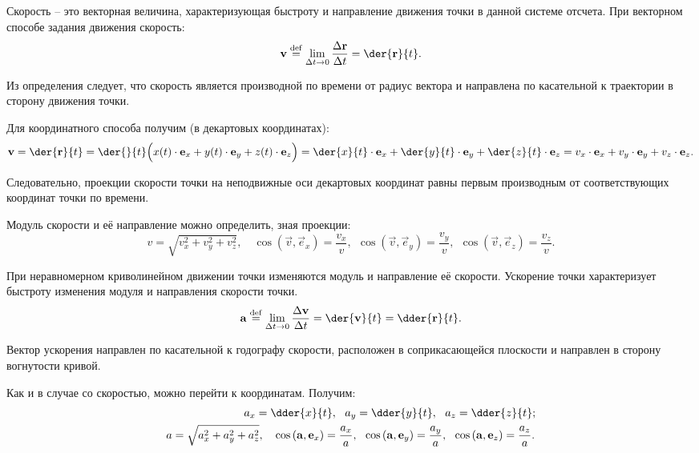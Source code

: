 
Скорость -- это векторная величина, характеризующая быстроту и направление
движения точки в данной системе отсчета. При векторном способе задания движения
скорость:
\[
    \vec{v} \defeq \lim_{\D t \to 0} \Der{\vec{r}}{t} = \der{\vec{r}}{t}.
\]

Из определения следует, что скорость является производной по времени от радиус
вектора и направлена по касательной к траектории в сторону движения точки.

Для координатного способа получим (в декартовых координатах):
\[
    \vec{v} = \der{\vec{r}}{t} = \der{}{t}\Big(x(t)\cdot\vec{e}_x +
    y(t)\cdot\vec{e}_y + z(t)\cdot\vec{e}_z\Big) = \der{x}{t}\cdot\vec{e}_x +
    \der{y}{t}\cdot\vec{e}_y + \der{z}{t}\cdot\vec{e}_z = v_x\cdot\vec{e}_x +
    v_y\cdot\vec{e}_y + v_z\cdot\vec{e}_z.
\]

Следовательно, проекции скорости точки на неподвижные оси декартовых координат
равны первым производным от соответствующих координат точки по времени.

Модуль скорости и её направление можно определить, зная проекции:
\[
    v = \sqrt{v_x^2 + v_y^2 + v_z^2}, \quad
    \cos\left(\vec{v}, \vec{e}_x\right) = \frac{v_x}{v},\ \ 
    \cos\left(\vec{v}, \vec{e}_y\right) = \frac{v_y}{v},\ \ 
    \cos\left(\vec{v}, \vec{e}_z\right) = \frac{v_z}{v}.
\]


При неравномерном криволинейном движении точки изменяются модуль и направление
её скорости. Ускорение точки характеризует быстроту изменения модуля и
направления скорости точки.
\[
    \vec{a} \defeq \lim_{\D t \to 0} \Der{\vec{v}}{t} = \der{\vec{v}}{t} =
    \dder{\vec{r}}{t}.
\]

Вектор ускорения направлен по касательной к годографу скорости, расположен в
соприкасающейся плоскости и направлен в сторону вогнутости кривой.

Как и в случае со скоростью, можно перейти к координатам. Получим:
\begin{align*}
    a_x = \dder{x}{t},\ \ a_y & = \dder{y}{t},\ \ a_z = \dder{z}{t}; \\
    a = \sqrt{a_x^2 + a_y^2 + a_z^2}, \quad
    \cos\left(\vec{a}, \vec{e}_x\right) = \frac{a_x}{a}, & \ \ 
    \cos\left(\vec{a}, \vec{e}_y\right) = \frac{a_y}{a},\ \ 
    \cos\left(\vec{a}, \vec{e}_z\right) = \frac{a_z}{a}.
\end{align*}

\newpage %
